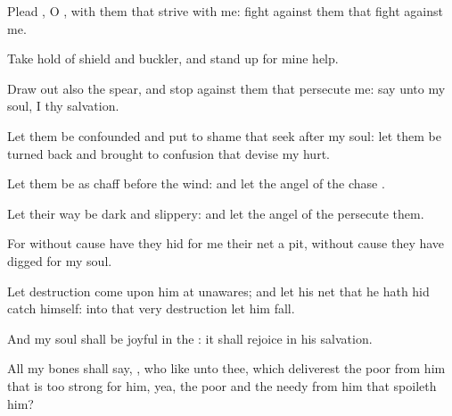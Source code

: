 {\Q {}Plead
{}, O
{}, with them that
strive with me:
fight against them that
fight against me.


\par }{\Q {}Take
hold of
shield and
buckler, and stand
up for mine
help.


\par }{\Q {}Draw
out also the
spear, and
stop
{}
against them that
persecute me:
say unto my
soul, I
{} thy
salvation.


\par }{\Q {}Let them be
confounded and put to
shame that
seek after my
soul: let them be
turned
back and brought to
confusion that
devise my
hurt.


\par }{\Q {}Let them be as
chaff
before the
wind: and let the
angel of the
{}
chase
{}.


\par }{\Q {}Let their
way be
dark and
slippery: and let the
angel of the
{}
persecute them.


\par }{\Q {}For without
cause have they
hid for me their
net
{} a
pit,
{} without
cause they have
digged for my
soul.


\par }{\Q {}Let
destruction
come upon him at
unawares; and let his
net that he hath
hid
catch himself: into that very
destruction let him
fall.


\par }{\Q {}And my
soul shall be
joyful in the
{}: it shall
rejoice in his
salvation.


\par }{\Q {}All my
bones shall
say,
{}, who
{} like unto thee, which
deliverest the
poor from him that is too
strong for him, yea, the
poor and the
needy from him that
spoileth him?


\par }{\BB \par }
